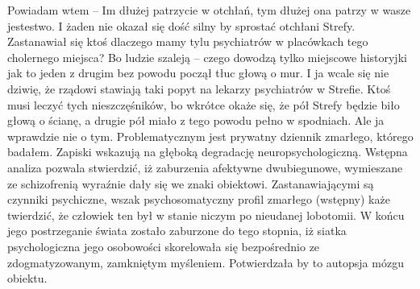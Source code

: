 \documentclass[../MAIN.tex]{subfiles}
\begin{document}
Powiadam wtem -- Im dłużej patrzycie w otchłań, tym dłużej ona patrzy w wasze jestestwo. I żaden nie okazał się dość silny by sprostać otchłani Strefy. Zastanawiał się ktoś dlaczego mamy tylu psychiatrów w placówkach tego cholernego miejsca? Bo ludzie szaleją -- czego dowodzą tylko miejscowe historyjki jak to jeden z drugim bez powodu począł tłuc głową o mur. I ja wcale się nie dziwię, że rządowi stawiają taki popyt na lekarzy psychiatrów w Strefie. Ktoś musi leczyć tych nieszczęśników, bo wkrótce okaże się, że pół Strefy będzie biło głową o ścianę, a drugie pół miało z tego powodu pełno w spodniach.
% 
% 
Ale ja wprawdzie nie o tym. Problematycznym jest prywatny dziennik zmarłego, którego badałem. Zapiski wskazują na głęboką degradację neuropsychologiczną. Wstępna analiza pozwala stwierdzić, iż zaburzenia afektywne dwubiegunowe, wymieszane ze schizofrenią wyraźnie dały się we znaki obiektowi. Zastanawiającymi są czynniki psychiczne, wszak psychosomatyczny profil zmarłego (wstępny) każe twierdzić, że człowiek ten był w stanie niczym po nieudanej lobotomii. W końcu jego postrzeganie świata zostało zaburzone do tego stopnia, iż siatka psychologiczna jego osobowości skorelowała się bezpośrednio ze zdogmatyzowanym, zamkniętym myśleniem. Potwierdzała by to autopsja mózgu obiektu.
\end{document}
